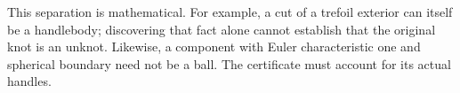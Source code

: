 This separation is mathematical.  For example, a cut of a trefoil exterior
can itself be a handlebody; discovering that fact alone cannot establish
that the original knot is an unknot.  Likewise, a component with Euler
characteristic one and spherical boundary need not be a ball.  The
certificate must account for its actual handles.
